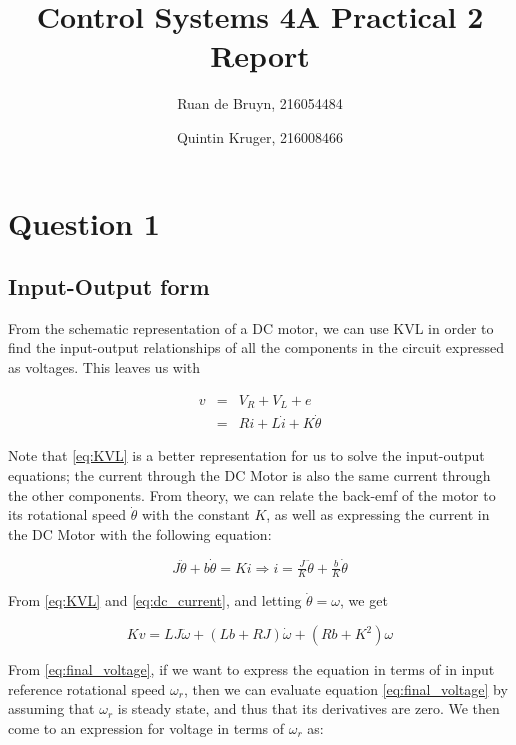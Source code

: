 \documentclass[a4paper, 12pt]{article}
\title{Control Systems 4A Practical 2 Report}
\author{Ruan de Bruyn, 216054484 \and Quintin Kruger, 216008466}
\begin{document}
\begin{titlepage}
  \maketitle
\end{titlepage}

\tableofcontents
\newpage
{}

\section{Question 1}
\subsection{Input-Output form}
From the schematic representation of a DC motor, we can use KVL in order to
find the input-output relationships of all the components in the circuit
expressed as voltages. This leaves us with

\begin{equation}
  \begin{array}{rcl}
    v & = & V_R + V_L + e \\
    & = & Ri + L\dot i + K \dot\theta
  \end{array}
  \label{eq:KVL}
\end{equation}

\noindent Note that \eqref{eq:KVL} is a better representation for us to solve
the input-output equations; the current through the DC Motor is also the
same current through the other components. From theory, we can relate the
back-emf of the motor to its rotational speed $\dot\theta$ with the constant
$K$, as well as expressing the current in the DC Motor with the following
equation:

\begin{equation}
  J\ddot\theta + b\dot\theta = Ki \Rightarrow i = \tfrac{J}{K} \ddot\theta + \tfrac{b}{K}\dot\theta
  \label{eq:dc_current}
\end{equation}

From \eqref{eq:KVL} and \eqref{eq:dc_current}, and letting $\dot\theta = \omega$, we get

\begin{equation}
  Kv = LJ\ddot\omega + (Lb + RJ)\dot\omega + (Rb + K^2)\omega
  \label{eq:final_voltage}
\end{equation}

From \eqref{eq:final_voltage}, if we want to express the equation in terms of
in input reference rotational speed $\omega_r$, then we can evaluate equation
\eqref{eq:final_voltage} by assuming that $\omega_r$ is steady state, and thus
that its derivatives are zero. We then come to an expression for voltage in
terms of $\omega_r$ as:
\end{document}
